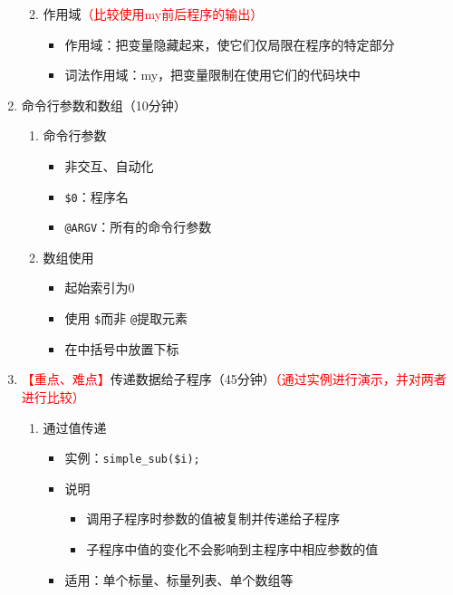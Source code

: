 \documentclass{TIJMUjiaoanLL}
\begin{document}
\begin{enumerate}
\begin{enumerate}
\begin{itemize}
	\end{itemize}
      \item 作用域\textcolor{red}{（比较使用my前后程序的输出）}
	\begin{itemize}
	  \item 作用域：把变量隐藏起来，使它们仅局限在程序的特定部分
	  \item 词法作用域：my，把变量限制在使用它们的代码块中
	\end{itemize}
    \end{enumerate}
  \item 命令行参数和数组（10分钟）
\vspace*{-1em}
\begin{multicols}{2}
    \begin{enumerate}
      \item 命令行参数
	\begin{itemize}
	  \item 非交互、自动化
	  \item \verb|$0|：程序名
	  \item \verb|@ARGV|：所有的命令行参数
	\end{itemize}
      \item 数组使用
	\begin{itemize}
	  \item 起始索引为0
	  \item 使用 \verb|$|而非 \verb|@|提取元素
	  \item 在中括号中放置下标
	\end{itemize}
    \end{enumerate}
\end{multicols}
\vspace*{-1em}
  \item \textcolor{red}{【重点、难点】}传递数据给子程序（45分钟）\textcolor{red}{（通过实例进行演示，并对两者进行比较）}
    \begin{enumerate}
      \item 通过值传递
	\begin{itemize}
	  \item 实例：\verb|simple_sub($i);|
	  \item 说明
	    \begin{itemize}
	      \item 调用子程序时参数的值被复制并传递给子程序
	      \item 子程序中值的变化不会影响到主程序中相应参数的值
	    \end{itemize}
	  \item 适用：单个标量、标量列表、单个数组等

\end{itemize}
\end{enumerate}
\end{enumerate}
\end{document}
